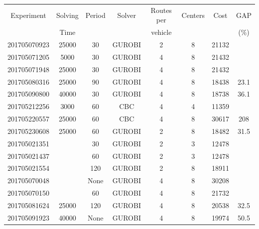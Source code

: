 \begin{center}
\begin{tabular}{c|c|c|c|c|c|c|c}
Experiment    & Solving  &  Period  &    Solver   &   Routes per &Centers &  Cost       &   GAP   \\
              & Time     &          &             &    vehicle   &        &             &   (\%)   \\ \hline
201705070923  & 25000         &  30      &    GUROBI   &   2          &  8     &  21132      &       \\ \hline
201705071205  &  5000         &  30      &    GUROBI   &   4          &  8     &  21432      &       \\ \hline
201705071948  & 25000         &  30      &    GUROBI   &   4          &  8     &  21432      &       \\ \hline
201705080316  & 25000         &  90      &    GUROBI   &   4          &  8     &  18438   &  23.1    \\ \hline
201705090800  & 40000         &  30      &    GUROBI   &   4          &  8     &  18738   &  36.1     \\ \hline
201705212256  & 3000          &  60      &    CBC      &   4          &  4     &  11359   &       \\ \hline
201705220557  & 25000         &  60      &    CBC      &   4          &  8     &  30617    &  208    \\ \hline
201705230608  & 25000         &  60      &    GUROBI   &   2          &  8     &  18482    &  31.5    \\ \hline
201705021351  &               &  30      &    GUROBI   &   2          &  3     &  12478   &       \\ \hline
201705021437  &               &  60      &    GUROBI   &   2          &  3     &  12478   &       \\ \hline
201705021554  &               & 120      &    GUROBI   &   2          &  8     &  18911   &       \\ \hline
201705070048    &             & None     &  GUROBI      &   4           &   8   &   30208 &      \\ \hline
201705070150    &               &   60      &   GUROBI  &   4           &   8   &   21732    &          \\ \hline
201705081624   & 25000         &   120      &   GUROBI  &   4           &   8   &   20538    &  32.5 \\ \hline
201705091923   & 40000         &   None      &   GUROBI  &   4           &   8   &   19974    &  50.5 \\ \hline
    \end{tabular}
\end{center}

